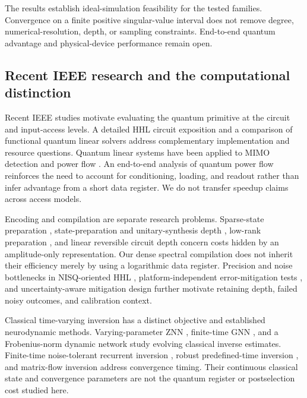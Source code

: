 \documentclass[journal]{IEEEtran}
\begin{document}
The results establish ideal-simulation feasibility for the tested families.
Convergence on a finite positive singular-value interval does not remove
degree, numerical-resolution, depth, or sampling constraints. End-to-end
quantum advantage and physical-device performance remain open.

\subsection{Recent IEEE research and the computational distinction}
Recent IEEE studies motivate evaluating the quantum primitive at the circuit
and input-access levels. A detailed HHL circuit exposition \cite{hhl2023}
and a comparison of functional quantum linear solvers \cite{functional2026}
address complementary implementation and resource questions. Quantum linear
systems have been applied to MIMO detection \cite{mimo2022} and power flow
\cite{powerflow2021}. An end-to-end analysis of quantum power flow
\cite{powerlimits2026} reinforces the need to account for conditioning,
loading, and readout rather than infer advantage from a short data register.
We do not transfer speedup claims across access models.

Encoding and compilation are separate research problems. Sparse-state
preparation \cite{sparseprep2021}, state-preparation and unitary-synthesis
depth \cite{optimalprep2023}, low-rank preparation \cite{lowrank2024}, and
linear reversible circuit depth \cite{depth2021} concern costs hidden by
an amplitude-only representation. Our dense spectral compilation does not
inherit their efficiency merely by using a logarithmic data register.
Precision and noise bottlenecks in NISQ-oriented HHL \cite{bottlenecks2024},
platform-independent error-mitigation tests \cite{mitigation2023}, and
uncertainty-aware mitigation design \cite{uncertainty2026} further motivate
retaining depth, failed noisy outcomes, and calibration context.

Classical time-varying inversion has a distinct objective and established
neurodynamic methods. Varying-parameter ZNN \cite{vp2021}, finite-time GNN
\cite{gnn2024}, and a Frobenius-norm dynamic network \cite{frobenius2025}
study evolving classical inverse estimates. Finite-time noise-tolerant
recurrent inversion \cite{finite2020}, robust predefined-time inversion
\cite{predefined2023}, and matrix-flow inversion \cite{flows2024} address
convergence timing. Their continuous classical state and convergence
parameters are not the quantum register or postselection cost studied here.
\end{document}
